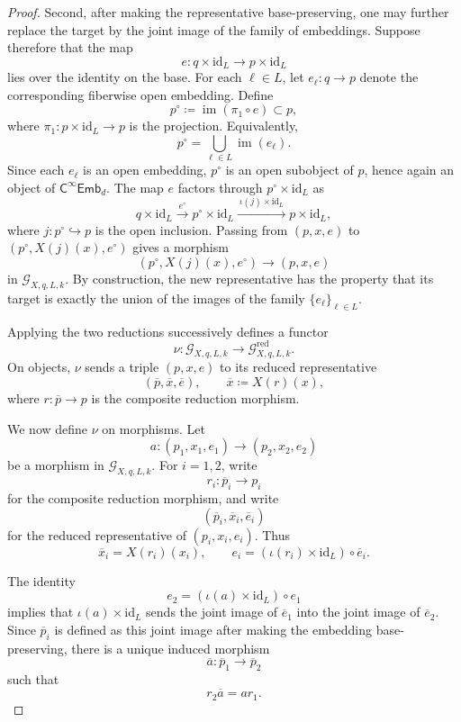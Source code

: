\documentclass[10pt,a4paper]{amsart}
\newcommand{\cat}[1]{\mathsf{#1}}
\newcommand{\fembnoniso}[1]{\cat{C}^{\infty}\cat{Emb}_{#1}}
\newcommand{\id}{\mathrm{id}}
\begin{document}
\begin{proof}
  Second, after making the representative base-preserving, one may further
  replace the target by the joint image of the family of embeddings. Suppose
  therefore that the map
  \[
    e:q\times \id_L\longrightarrow p\times \id_L
  \]
  lies over the identity on the base. For each \(\ell\in L\), let
  \(e_\ell:q\to p\) denote the corresponding fiberwise open embedding. Define
  \[
    p^\circ\coloneqq \operatorname{im}(\pi_1\circ e)\subset p,
  \]
  where \(\pi_1:p\times \id_L\to p\) is the projection. Equivalently,
  \[
    p^\circ=\bigcup_{\ell\in L}\operatorname{im}(e_\ell).
  \]
  Since each \(e_\ell\) is an open embedding, \(p^\circ\) is an open subobject
  of \(p\), hence again an object of \(\fembnoniso{d}\). The map \(e\) factors
  through \(p^\circ\times \id_L\) as
  \[
    q\times \id_L
    \xrightarrow{\ e^\circ\ }
    p^\circ\times \id_L
    \xrightarrow{\ \iota(j)\times \id_L\ }
    p\times \id_L,
  \]
  where \(j:p^\circ\hookrightarrow p\) is the open inclusion. Passing from
  \((p,x,e)\) to \((p^\circ,X(j)(x),e^\circ)\) gives a morphism
  \[
    (p^\circ,X(j)(x),e^\circ)\longrightarrow (p,x,e)
  \]
  in \(\mathcal{G}_{X,q,L,k}\). By construction, the new representative has
  the property that its target is exactly the union of the images of the
  family \(\{e_\ell\}_{\ell\in L}\).

  Applying the two reductions successively defines a functor
  \[
    \nu:\mathcal{G}_{X,q,L,k}\longrightarrow
    \mathcal{G}^{\mathrm{red}}_{X,q,L,k}.
  \]
  On objects, \(\nu\) sends a triple \((p,x,e)\) to its reduced representative
  \[
    (\overline{p},\overline{x},\overline{e}),
    \qquad
    \overline{x}\coloneqq X(r)(x),
  \]
  where \(r:\overline{p}\to p\) is the composite reduction morphism.

  We now define \(\nu\) on morphisms. Let
  \[
    a:(p_1,x_1,e_1)\longrightarrow(p_2,x_2,e_2)
  \]
  be a morphism in \(\mathcal{G}_{X,q,L,k}\). For \(i=1,2\), write
  \[
    r_i:\overline{p}_i\longrightarrow p_i
  \]
  for the composite reduction morphism, and write
  \[
    (\overline{p}_i,\overline{x}_i,\overline{e}_i)
  \]
  for the reduced representative of \((p_i,x_i,e_i)\). Thus
  \[
    \overline{x}_i=X(r_i)(x_i),
    \qquad
    e_i=(\iota(r_i)\times\id_L)\circ \overline{e}_i.
  \]

  The identity
  \[
    e_2=(\iota(a)\times\id_L)\circ e_1
  \]
  implies that \(\iota(a)\times\id_L\) sends the joint image of
  \(\overline{e}_1\) into the joint image of \(\overline{e}_2\). Since
  \(\overline{p}_i\) is defined as this joint image after making the embedding
  base-preserving, there is a unique induced morphism
  \[
    \overline{a}:\overline{p}_1\longrightarrow\overline{p}_2
  \]
  such that
  \[
    r_2\overline{a}=a r_1.
  \]


\end{proof}
\end{document}
